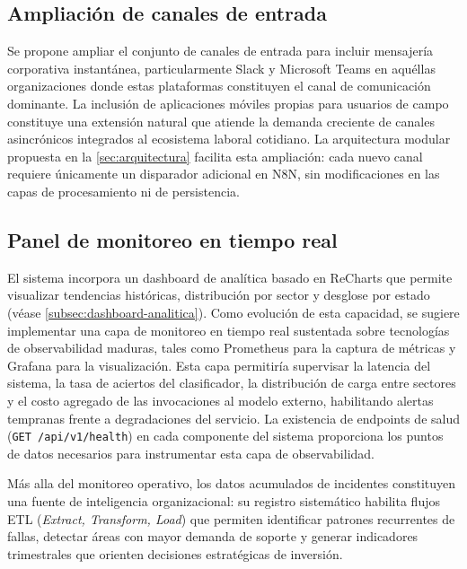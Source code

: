 \subsection{Ampliación de canales de entrada}\label{subsec:ampliacion-canales}

Se propone ampliar el conjunto de canales de entrada para incluir mensajería corporativa instantánea, particularmente Slack y Microsoft Teams en aquéllas organizaciones donde estas plataformas constituyen el canal de comunicación dominante. La inclusión de aplicaciones móviles propias para usuarios de campo constituye una extensión natural que atiende la demanda creciente de canales asincrónicos integrados al ecosistema laboral cotidiano. La arquitectura modular propuesta en la \autoref{sec:arquitectura} facilita esta ampliación: cada nuevo canal requiere únicamente un disparador adicional en N8N, sin modificaciones en las capas de procesamiento ni de persistencia.

\subsection{Panel de monitoreo en tiempo real}\label{subsec:panel-monitoreo}

El sistema incorpora un dashboard de analítica basado en ReCharts que permite visualizar tendencias históricas, distribución por sector y desglose por estado (véase \autoref{subsec:dashboard-analitica}). Como evolución de esta capacidad, se sugiere implementar una capa de monitoreo en tiempo real sustentada sobre tecnologías de observabilidad maduras, tales como Prometheus para la captura de métricas y Grafana para la visualización. Esta capa permitiría supervisar la latencia del sistema, la tasa de aciertos del clasificador, la distribución de carga entre sectores y el costo agregado de las invocaciones al modelo externo, habilitando alertas tempranas frente a degradaciones del servicio. La existencia de endpoints de salud (\texttt{GET /api/v1/health}) en cada componente del sistema proporciona los puntos de datos necesarios para instrumentar esta capa de observabilidad.

Más alla del monitoreo operativo, los datos acumulados de incidentes constituyen una fuente de inteligencia organizacional: su registro sistemático habilita flujos ETL (\emph{Extract, Transform, Load}) que permiten identificar patrones recurrentes de fallas, detectar áreas con mayor demanda de soporte y generar indicadores trimestrales que orienten decisiones estratégicas de inversión.

